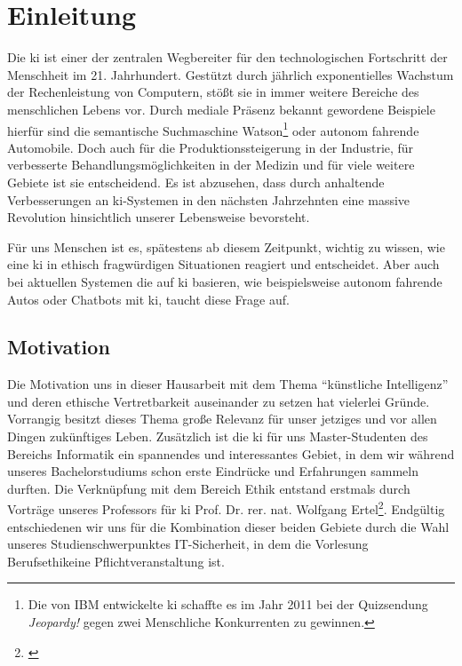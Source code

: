 \section{Einleitung}
Die \ac{ki} ist einer der zentralen Wegbereiter für den technologischen Fortschritt der Menschheit im 21. Jahrhundert.
Gestützt durch jährlich exponentielles Wachstum der Rechenleistung von Computern, stößt sie in immer weitere Bereiche des menschlichen Lebens vor.
Durch mediale Präsenz bekannt gewordene Beispiele hierfür sind die semantische Suchmaschine Watson\footnote{Die von IBM entwickelte \ac{ki} schaffte es im Jahr 2011 bei der Quizsendung \textit{Jeopardy!} gegen zwei Menschliche Konkurrenten zu gewinnen.} oder autonom fahrende Automobile. %
Doch auch für die Produktionssteigerung in der Industrie, für verbesserte Behandlungsmöglichkeiten in der Medizin und für viele weitere Gebiete ist sie entscheidend.
Es ist abzusehen, dass durch anhaltende Verbesserungen an \ac{ki}-Systemen in den nächsten Jahrzehnten eine massive Revolution hinsichtlich unserer Lebensweise bevorsteht.

Für uns Menschen ist es, spätestens ab diesem Zeitpunkt, wichtig zu wissen, wie eine \ac{ki} in ethisch fragwürdigen Situationen reagiert und entscheidet. Aber auch bei aktuellen Systemen die auf \ac{ki} basieren, wie beispielsweise autonom fahrende Autos oder Chatbots mit \ac{ki}, taucht diese Frage auf. 

\subsection{Motivation}
Die Motivation uns in dieser Hausarbeit mit dem Thema \enquote{künstliche Intelligenz} und deren ethische Vertretbarkeit auseinander zu setzen hat vielerlei Gründe. 
Vorrangig besitzt dieses Thema große Relevanz für unser jetziges und vor allen Dingen zukünftiges Leben. 
Zusätzlich ist die \ac{ki} für uns Master-Studenten des Bereichs Informatik ein spannendes und interessantes Gebiet, in dem wir während unseres Bachelorstudiums schon erste Eindrücke und Erfahrungen sammeln durften.
Die Verknüpfung mit dem Bereich Ethik entstand erstmals durch Vorträge unseres Professors für \ac{ki} Prof. Dr. rer. nat. Wolfgang Ertel\footnote{\cite{ProfessorErtel}}. Endgültig entschiedenen wir uns für die Kombination dieser beiden Gebiete durch die Wahl unseres Studienschwerpunktes IT-Sicherheit, in dem die Vorlesung \glqq Berufsethik\grqq eine Pflichtveranstaltung ist.


